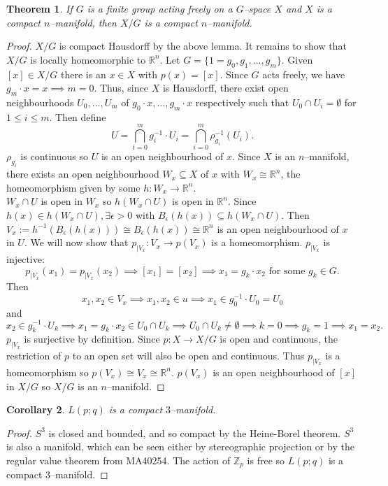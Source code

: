 \documentclass{article}
\newtheorem{theorem}{Theorem}[section]
\newtheorem{corollary}[theorem]{Corollary}
\begin{document}
\begin{theorem}
If $G$ is a finite group acting freely on a $G$--space $X$ and $X$ is a compact $n$--manifold, then $X/G$ is a compact $n$--manifold.
\end{theorem}
\begin{proof}
$X/G$ is compact Hausdorff by the above lemma. It remains to show that $X/G$ is locally homeomorphic to $\mathbb{R}^n$. Let $G=\{1=g_0,g_1,...,g_m\}$. Given $[x]\in X/G$ there is an $x\in X$ with $p(x)=[x]$. Since $G$ acts freely, we have $g_m\cdot x=x\implies m=0$. Thus, since $X$ is Hausdorff, there exist open neighbourhoods $U_0,...,U_m$ of $g_0\cdot x,...,g_m\cdot x$ respectively such that $U_0\cap U_i=\emptyset$ for $1\leq i\leq m$. Then define \[U=\bigcap_{i=0}^mg_i^{-1}\cdot U_i=\bigcap_{i=0}^m\rho_{g_i}^{-1}(U_i).\] $\rho_{g_i}$ is continuous so $U$ is an open neighbourhood of $x$. Since $X$ is an $n$--manifold, there exists an open neighbourhood $W_x\subseteq X$ of $x$ with $W_x\cong\mathbb{R}^n$, the homeomorphism given by some $h:W_x\to \mathbb{R}^n$.\\ $W_x\cap U$ is open in $W_x$ so $h(W_x\cap U)$ is open in $\mathbb{R}^n$. Since $h(x)\in h(W_x\cap U),\exists\epsilon>0$ with $B_\epsilon(h(x))\subseteq h(W_x\cap U)$. Then $V_x:=h^{-1}(B_\epsilon (h(x)))\cong B_\epsilon(h(x))\cong\mathbb{R}^n$ is an open neighbourhood of $x$ in $U$. We will now show that $p_{|V_x}:V_x\to p(V_x)$ is a homeomorphism. $p_{|V_x}$ is injective: \[p_{|V_x}(x_1)=p_{|V_x}(x_2)\implies[x_1]=[x_2]\implies x_1=g_k\cdot x_2\text{ for some }g_k\in G.\] Then \[x_1,x_2\in V_x\implies x_1,x_2\in u\implies x_1\in g_0^{-1}\cdot U_0=U_0\] and \[x_2\in g_k^{-1}\cdot U_k\implies x_1=g_k\cdot x_2\in U_0\cap U_k\implies U_0\cap U_k\neq \emptyset\implies k=0\implies g_k=1\implies x_1=x_2.\]
$p_{|V_x}$ is surjective by definition. Since $p:X\to X/G$ is open and continuous, the restriction of $p$ to an open set will also be open and continuous. Thus $p_{|V_x}$ is a homeomorphism so $p(V_x)\cong V_x\cong\mathbb{R}^n$. $p(V_x)$ is an open neighbourhood of $[x]$ in $X/G$ so $X/G$ is an $n$--manifold.
\end{proof}
\begin{corollary}
$L(p;q)$ is a compact $3$--manifold.
\end{corollary}
\begin{proof}
$S^3$ is closed and bounded, and so compact by the Heine-Borel theorem. $S^3$ is also a manifold, which can be seen either by stereographic projection or by the regular value theorem from MA40254. The action of $\mathbb{Z}_p$ is free so $L(p;q)$ is a compact $3$--manifold.
\end{proof}
\end{document}
